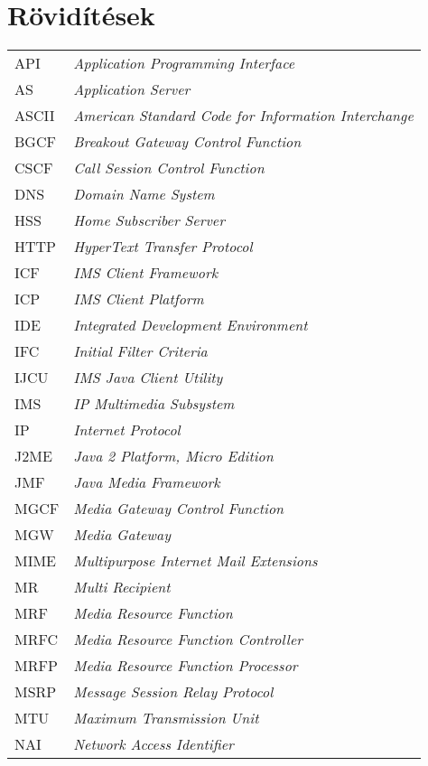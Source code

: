 

\section*{Rövidítések}
\label{sec:roviditesek}

\begin{tabular}{p{2cm}l}
API & \emph{Application Programming Interface} \\
AS & \emph{Application Server} \\
ASCII & \emph{American Standard Code for Information Interchange} \\
BGCF & \emph{Breakout Gateway Control Function} \\
CSCF & \emph{Call Session Control Function} \\
DNS & \emph{Domain Name System} \\
HSS & \emph{Home Subscriber Server} \\
HTTP & \emph{HyperText Transfer Protocol} \\
ICF & \emph{IMS Client Framework} \\
ICP & \emph{IMS Client Platform} \\
IDE & \emph{Integrated Development Environment} \\
IFC & \emph{Initial Filter Criteria} \\
IJCU & \emph{IMS Java Client Utility} \\
IMS & \emph{IP Multimedia Subsystem} \\
IP & \emph{Internet Protocol} \\
J2ME & \emph{Java 2 Platform, Micro Edition} \\
JMF & \emph{Java Media Framework} \\
MGCF & \emph{Media Gateway Control Function} \\
MGW & \emph{Media Gateway} \\
MIME & \emph{Multipurpose Internet Mail Extensions} \\
MR & \emph{Multi Recipient} \\
MRF & \emph{Media Resource Function} \\
MRFC & \emph{Media Resource Function Controller} \\
MRFP & \emph{Media Resource Function Processor} \\
MSRP & \emph{Message Session Relay Protocol} \\
MTU & \emph{Maximum Transmission Unit} \\
NAI & \emph{Network Access Identifier} \\

\end{tabular}
